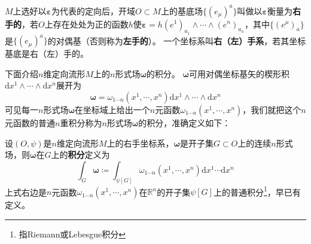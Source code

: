 \begin{definition}
    $M$上选好以$\bm\varepsilon$为代表的定向后，开域$O \subset M$上的基底场$\{(e_\mu)^a\}$叫做以$\bm\varepsilon$衡量为\textbf{右手的}，若$O$上存在处处为正的函数$h$使$\bm\varepsilon = h(e^1)_{a_1} \wedge \cdots \wedge (e^n)_{a_n}$，其中$\{(e^\mu)_a\}$是$\{(e_\mu)^a\}$的对偶基（否则称为\textbf{左手的}）。
    一个坐标系叫\textbf{右（左）手系}，若其坐标基底是右（左）手的。
\end{definition}

下面介绍$n$维定向流形$M$上的$n$形式场$\bm\omega$的积分。
$\bm\omega$可用对偶坐标基矢的楔形积$\mathrm{d}x^1 \wedge \cdots \wedge \mathrm{d}x^n$展开为
$$\bm\omega = \omega_{1 \cdots n}(x^1, \cdots, x^n)\mathrm{d}x^1 \wedge \cdots \wedge \mathrm{d}x^n$$
可见每一$n$形式场$\bm\omega$在坐标域上给出一个$n$元函数$\omega_{1 \cdots n}(x^1, \cdots, x^n)$，我们就把这个$n$元函数的普通$n$重积分称为$n$形式场$\bm\omega$的积分，准确定义如下：

\begin{definition}
    设$(O, \psi)$是$n$维定向流形$M$上的右手坐标系，$\bm\omega$是开子集$G \subset O$上的连续$n$形式场，则$\bm\omega$在$G$上的\textbf{积分}定义为
    $$\int_G\bm\omega \coloneq \int_{\psi[G]}\omega_{1 \cdots n}(x^1, \cdots, x^n)\mathrm{d}x^1 \cdots \mathrm{d}x^n$$
    上式右边是$n$元函数$\omega_{1 \cdots n}(x^1, \cdots, x^n)$在$\mathbb{R}^n$的开子集$\psi[G]$上的普通积分\footnote{指Riemann或Lebesgue积分}，早已有定义。
\end{definition}

